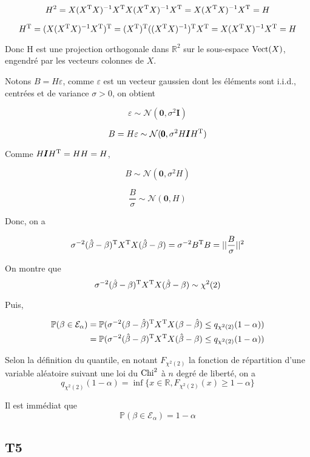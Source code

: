 \documentclass[a4paper,12pt]{article}
\begin{document}
$$H^2 = X(X^{\text T}X)^{-1}X^{\text T}X(X^{\text T}X)^{-1}X^{\text T} = X(X^{\text T}X)^{-1}X^{\text T} = H$$

$$H^{\text T} = (X(X^{\text T}X)^{-1}X^{\text T})^{\text T} = (X^{\text T}) ^ {\text T} ((X^{\text T}X)^{-1}) ^{\text T} X^{\text T} = X(X^{\text T}X)^{-1}X^{\text T} = H $$

Donc H est une projection orthogonale dans $\mathbb{R}^2$ sur le sous-espace ${\rm Vect} (X)$, engendré par les vecteurs colonnes de $X$.

Notons $B = H \varepsilon$, comme $\varepsilon$ est un vecteur gaussien dont les éléments sont i.i.d., centrées et de variance $\sigma > 0$, on obtient

$$ \varepsilon \sim \mathcal{N}(\pmb{0}, \sigma^2\pmb{I})  $$

$$ B = H\varepsilon \sim \mathcal{N}(\pmb{0}, \sigma^2H\pmb{I}H^{\text T}) $$

Comme $H\pmb{I}H^{\text T} = H H = H$,

$$ B \sim \mathcal{N}(\pmb{0}, \sigma^2H) $$

$$ \frac{B}{\sigma} \sim \mathcal{N}(\pmb{0}, H) $$

Donc, on a

$$ \sigma^{-2}(\hat \beta - \beta)^{\text T}X^{\text T}X(\hat \beta - \beta) = \sigma^{-2} B^{\text T}B = || \frac{B}{\sigma} ||^2 $$

On montre que
$$\sigma^{-2}(\hat \beta - \beta)^{\text T}X^{\text T}X(\hat \beta - \beta) \sim \chi^2(2)$$

Puis,

\begin{align*}
	\mathbb{P}(\beta \in \mathcal{E}_{\alpha}) &= \mathbb{P}(\sigma^{-2}(\beta - \hat \beta)^{\text T}X^{\text T}X(\beta - \hat \beta) \le q_{\chi^2(2)}(1-\alpha)) \\
	&= \mathbb{P}(\sigma^{-2}(\hat \beta - \beta)^{\text T}X^{\text T}X(\hat \beta - \beta) \le q_{\chi^2(2)}(1-\alpha))
\end{align*}


Selon la définition du quantile, en notant $F_{\chi^2(2)}$ la fonction de répartition d'une variable aléatoire suivant une loi du $\rm{Chi}^2$ à $n$ degré de liberté, on a
$$q_{\chi^2(2)}(1-\alpha) = \inf{\{x \in \mathbb{R}, F_{\chi^2(2)}(x) \ge 1-\alpha\}}$$

Il est immédiat que
$$\mathbb{P}(\beta \in \mathcal{E}_{\alpha}) = 1 - \alpha$$

\subsection*{T5}
\end{document}

